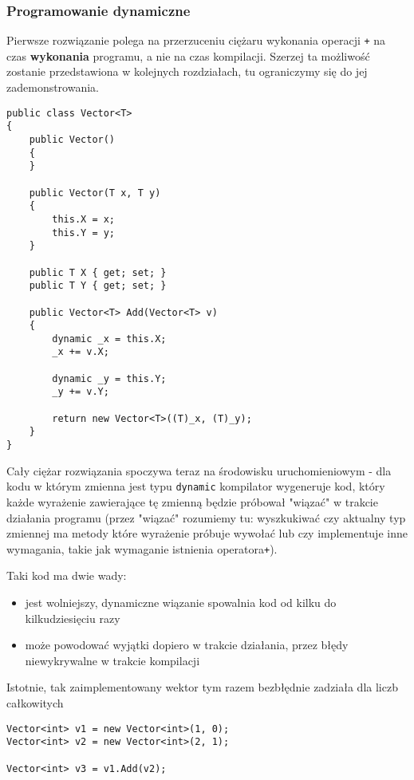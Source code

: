 \subsubsection{Programowanie dynamiczne}

Pierwsze rozwiązanie polega na przerzuceniu ciężaru wykonania operacji {\tt +} na czas {\bf wykonania} programu, a nie na 
czas kompilacji. Szerzej ta możliwość zostanie przedstawiona w kolejnych rozdziałach, tu ograniczymy się do jej zademonstrowania.

\begin{scriptsize}
\begin{verbatim}
public class Vector<T>
{
    public Vector()
    {
    }

    public Vector(T x, T y)
    {
        this.X = x;
        this.Y = y;
    }

    public T X { get; set; }
    public T Y { get; set; }

    public Vector<T> Add(Vector<T> v)
    {
        dynamic _x = this.X;
        _x += v.X;

        dynamic _y = this.Y;
        _y += v.Y;

        return new Vector<T>((T)_x, (T)_y);
    }
}
\end{verbatim}
\end{scriptsize}

Cały ciężar rozwiązania spoczywa teraz na środowisku uruchomieniowym - dla kodu w którym zmienna jest typu 
{\tt dynamic} kompilator wygeneruje kod, który każde wyrażenie zawierające tę zmienną będzie próbował "wiązać"
w trakcie działania programu (przez "wiązać" rozumiemy tu: wyszkukiwać czy aktualny typ zmiennej ma metody
które wyrażenie próbuje wywołać lub czy implementuje inne wymagania, takie jak wymaganie istnienia operatora{\tt +}).

Taki kod ma dwie wady:
\begin{itemize}
\item jest wolniejszy, dynamiczne wiązanie spowalnia kod od kilku do kilkudziesięciu razy
\item może powodować wyjątki dopiero w trakcie działania, przez błędy niewykrywalne w trakcie kompilacji
\end{itemize}

Istotnie, tak zaimplementowany wektor tym razem bezbłędnie zadziała dla liczb całkowitych

\begin{scriptsize}
\begin{verbatim}
Vector<int> v1 = new Vector<int>(1, 0);
Vector<int> v2 = new Vector<int>(2, 1);

Vector<int> v3 = v1.Add(v2);
\end{verbatim}
\end{scriptsize}

